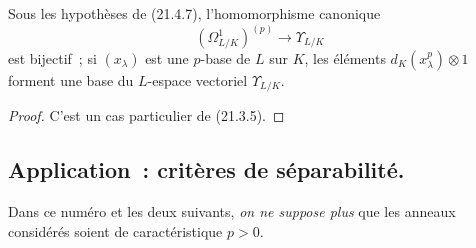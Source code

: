 \begin{proposition}[21.4.8]
\label{0.21.4.8-fr}
Sous les hypothèses de (21.4.7), l'homomorphisme canonique
\begin{equation}
\tag{21.4.8.1}\label{0.21.4.8.1-fr}
(\Omega^1_{L/K})^{(p)}\longrightarrow\Upsilon_{L/K}
\end{equation}
est bijectif~; si $(x_\lambda)$ est une $p$-base de $L$ sur $K$, les éléments
$d_K(x_\lambda^p)\otimes1$ forment une base du $L$-espace vectoriel $\Upsilon_{L/K}$.
\end{proposition}
\begin{proof}
C'est un cas particulier de (21.3.5).
\end{proof}

\subsection{Application~: critères de séparabilité.}
\label{0.21.5-fr}

Dans ce numéro et les deux suivants, \emph{on ne suppose plus} que les anneaux
considérés soient de caractéristique $p>0$.

